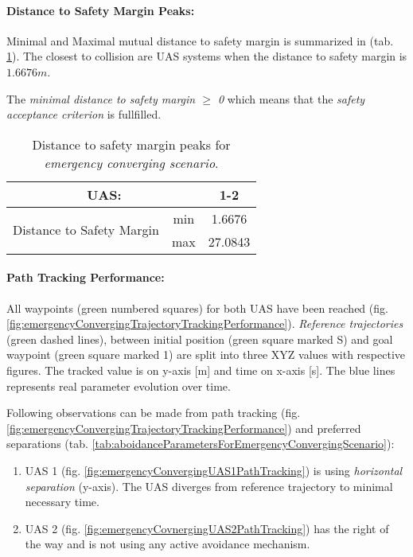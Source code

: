 \paragraph{Distance to Safety Margin Peaks:} Minimal and Maximal mutual distance to safety margin is summarized in (tab. \ref{tab:testCaseEmergencyConvergingSafetyMarginDistances}). The closest to collision are UAS systems when the distance to safety margin is $1.6676m$.

The \emph{minimal distance to safety margin  $\ge$ 0} which means that the \emph{safety acceptance criterion} is fullfilled. 

\begin{table}[H]
    \centering
    \begin{tabular}{c|c||c}
    \multicolumn{2}{c||}{UAS:} & 1-2 \\\hline\hline
    \multirow{2}{*}{Distance to Safety Margin} & min & 1.6676 \\\cline{2-3}
                                            & max & 27.0843 \\
    \end{tabular}
    \caption{Distance to safety margin peaks for \emph{emergency converging scenario}.}
    \label{tab:testCaseEmergencyConvergingSafetyMarginDistances}
\end{table}

\paragraph{Path Tracking Performance:} All waypoints (green numbered squares) for both  UAS have been reached (fig. \ref{fig:emergencyConvergingTrajectoryTrackingPerformance}). \emph{Reference trajectories} (green dashed lines), between initial position (green square marked S) and goal waypoint (green square marked 1) are split into three XYZ values with respective figures. The tracked value is on y-axis [m] and time on x-axis [s]. The blue lines represents real parameter evolution over time.

Following observations can be made from path tracking (fig. \ref{fig:emergencyConvergingTrajectoryTrackingPerformance}) and preferred separations (tab. \ref{tab:aboidanceParametersForEmergencyConvergingScenario}):

\begin{enumerate}
    \item UAS 1 (fig. \ref{fig:emergencyConvergingUAS1PathTracking}) is using \emph{horizontal separation} (y-axis). The UAS diverges from reference trajectory to minimal necessary time.
    \item UAS 2 (fig. \ref{fig:emergencyCovnergingUAS2PathTracking}) has the right of the way and is not using any active avoidance mechanism. 
\end{enumerate}

